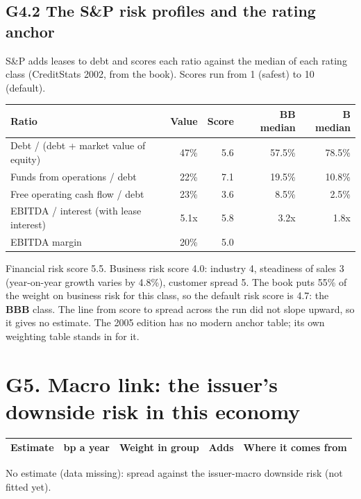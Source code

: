 \documentclass[11pt,a4paper]{article}
\begin{document}
\subsection*{G4.2 The S\&P risk profiles and the rating anchor}
S\&P adds leases to debt and scores each ratio against the median of each rating class (CreditStats 2002, from the book). Scores run from 1 (safest) to 10 (default).
\begin{center}\footnotesize\setlength{\tabcolsep}{3.5pt}\begin{tabular}{@{}lrrrr@{}}\toprule
Ratio & Value & Score & BB median & B median \\\midrule
Debt / (debt + market value of equity) & 47\% & 5.6 & 57.5\% & 78.5\% \\
Funds from operations / debt & 22\% & 7.1 & 19.5\% & 10.8\% \\
Free operating cash flow / debt & 23\% & 3.6 & 8.5\% & 2.5\% \\
EBITDA / interest (with lease interest) & 5.1x & 5.8 & 3.2x & 1.8x \\
EBITDA margin & 20\% & 5.0 &  &  \\
\bottomrule\end{tabular}\end{center}
Financial risk score 5.5. Business risk score 4.0: industry 4, steadiness of sales 3 (year-on-year growth varies by 4.8\%), customer spread 5. The book puts 55\% of the weight on business risk for this class, so the default risk score is 4.7: the \textbf{BBB} class. The line from score to spread across the run did not slope upward, so it gives no estimate. The 2005 edition has no modern anchor table; its own weighting table stands in for it.
\section*{G5. Macro link: the issuer's downside risk in this economy}
\par\noindent{}
\begin{center}\footnotesize\setlength{\tabcolsep}{3.5pt}\begin{tabular}{@{}p{6.2cm}rrrp{4.2cm}@{}}\toprule
Estimate & bp a year & Weight in group & Adds & Where it comes from \\\midrule
\bottomrule\end{tabular}\end{center}
No estimate (data missing): spread against the issuer-macro downside risk (not fitted yet).
\end{document}
